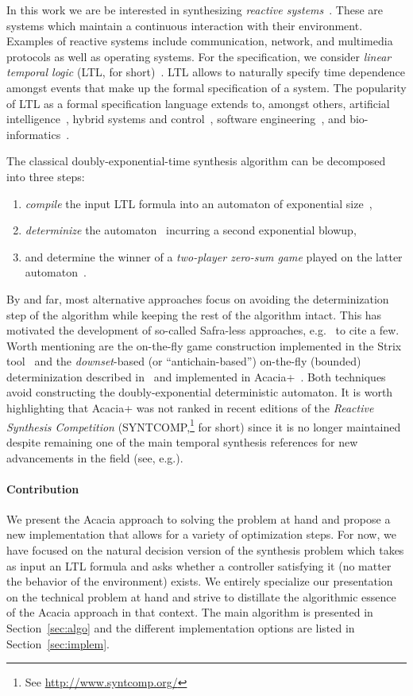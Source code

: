 \documentclass[sigconf,screen,nonacm]{acmart}
\begin{document}
In this work we are be interested in synthesizing \emph{reactive
systems}~\cite{hp84}. These are systems which maintain a continuous
interaction with their environment.  Examples of reactive systems include
communication, network, and multimedia protocols as well as operating systems.
For the specification, we consider \emph{linear temporal logic} (LTL, for
short)~\cite{pnueli77}. LTL allows to naturally specify time dependence
amongst events that make up the formal specification of a system. The
popularity of LTL as a formal specification language extends to, amongst
others, artificial intelligence~\cite{gv16,cm19,gnpw20}, hybrid systems and
control~\cite{bvpyb16}, software engineering~\cite{lpb15}, and
bio-informatics~\cite{abbdfhinprs17}.

The
classical doubly-exponential-time synthesis algorithm can be decomposed
into three steps:
\begin{enumerate}
  \item \emph{compile} the input LTL formula into an automaton of exponential
    size~\cite{vw84},
  \item \emph{determinize} the automaton~\cite{safra88,piterman07} incurring a
    second exponential blowup,
  \item and determine the winner of a \emph{two-player zero-sum game} played
    on the latter automaton~\cite{pr89}.
\end{enumerate}
By and far, most alternative approaches focus on avoiding the determinization
step of the algorithm while keeping the rest of the algorithm intact.  This has
motivated the development of so-called Safra-less approaches,
e.g.~\cite{kpv06,eks16,ekrs17,tushy17} to cite a few.  Worth mentioning are the
on-the-fly game construction implemented in the Strix tool~\cite{msl18} and the
\emph{downset}-based (or ``antichain-based'') on-the-fly (bounded)
determinization described in~\cite{fjr09} and implemented in
Acacia+~\cite{bbfjr12}. Both techniques avoid constructing the
doubly-exponential deterministic automaton.  It is worth highlighting that
Acacia+ was not ranked in recent editions of the \emph{Reactive Synthesis
  Competition} (SYNTCOMP,\footnote{See \url{http://www.syntcomp.org/}} for
short) since it is no longer maintained despite remaining one of the main
temporal synthesis references for new advancements in the field (see,
e.g.\cite{ffrt17,ztlpv17,apsec20,lms20,bltv20}).

\paragraph*{Contribution}
We present the Acacia approach to solving the problem at hand and propose a new
implementation that allows for a variety of optimization steps.  For now, we
have focused on the natural decision version of the synthesis problem which
takes as input an LTL formula and asks whether a controller satisfying it (no
matter the behavior of the environment) exists.  We entirely specialize our
presentation on the technical problem at hand and strive to distillate the
algorithmic essence of the Acacia approach in that context.  The main algorithm
is presented in Section~\ref{sec:algo} and the different implementation options
are listed in Section~\ref{sec:implem}.
\end{document}
